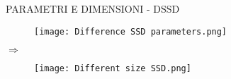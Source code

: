 \begin{frame}{PARAMETRI E DIMENSIONI - DSSD}
    \begin{minipage}{\linewidth}
        \centering
        \begin{minipage}{0.45\linewidth}
            \begin{figure}
                \centering
                \texttt{[image: Difference SSD parameters.png]}
                \centering
            \end{figure}
        \end{minipage}
        $\Rightarrow$
        \hspace{-0.5cm}
        \begin{minipage}{0.45\linewidth}
            \begin{figure}
                \centering
                \texttt{[image: Different size SSD.png]}
                \centering
            \end{figure}
        \end{minipage}
    \end{minipage}
\end{frame}

